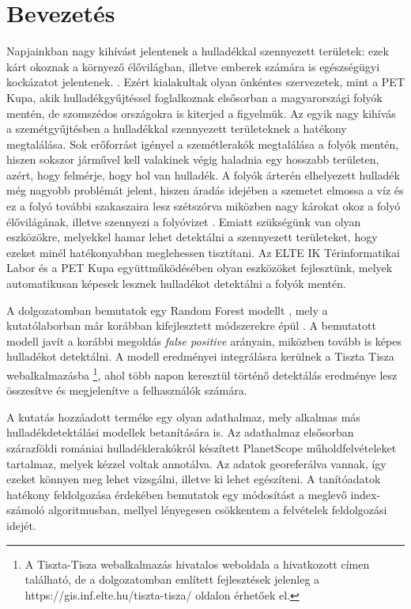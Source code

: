 \chapter{Bevezetés}
\label{ch:intro}

Napjainkban nagy kihívást jelentenek a hulladékkal szennyezett területek: ezek kárt okoznak a környező élővilágban, illetve emberek számára is egészségügyi kockázatot jelentenek. \cite{kibria2023PlasticWaste}. Ezért kialakultak olyan önkéntes szervezetek, mint a PET Kupa, akik hulladékgyűjtéssel foglalkoznak elsősorban a magyarországi folyók mentén, de szomszédos országokra is kiterjed a figyelmük. Az egyik nagy kihívás a szemétgyűjtésben a hulladékkal szennyezett területeknek a hatékony megtalálása. Sok erőforrást igényel a szemétlerakók megtalálása a folyók mentén, hiszen sokszor járművel kell valakinek végig haladnia egy hosszabb területen, azért, hogy felmérje, hogy hol van hulladék. A folyók árterén elhelyezett hulladék még nagyobb problémát jelent, hiszen áradás idejében a szemetet elmossa a víz és ez a folyó további szakaszaira lesz szétszórva miközben nagy károkat okoz a folyó élővilágának, illetve szennyezi a folyóvizet \cite{nyberg2023, vanEmmerik2023}. Emiatt szükségünk van olyan eszközökre, melyekkel hamar lehet detektálni a szennyezett területeket, hogy ezeket minél hatékonyabban meglehessen tisztítani. Az ELTE IK Térinformatikai Labor és a PET Kupa együttműködésében olyan eszközöket fejlesztünk, melyek automatikusan képesek lesznek hulladékot detektálni a folyók mentén.

A dolgozatomban bemutatok egy Random Forest modellt \cite{breiman2001}, mely a kutatólaborban már korábban kifejlesztett módszerekre épül \cite{magyar2023}. A bemutatott modell javít a korábbi megoldás \textit{false positive} arányain, miközben tovább is képes hulladékot detektálni. A modell eredményei integrálásra kerülnek a Tiszta Tisza webalkalmazásba \cite{tisztatisza2024}\footnote{A Tiszta-Tisza webalkalmazás hivatalos weboldala a hivatkozott címen található, de a dolgozatomban említett fejlesztések jelenleg a https://gis.inf.elte.hu/tiszta-tisza/ oldalon érhetőek el.}, ahol több napon keresztül történő detektálás eredménye lesz összesítve és megjelenítve a felhasználók számára.

A kutatás hozzáadott terméke egy olyan adathalmaz, mely alkalmas más hulladékdetektálási modellek betanítására is. Az adathalmaz elsősorban szárazföldi romániai hulladéklerakókról készített PlanetScope műholdfelvételeket tartalmaz, melyek kézzel voltak annotálva. Az adatok georeferálva vannak, így ezeket könnyen meg lehet vizsgálni, illetve ki lehet egészíteni. A tanítóadatok hatékony feldolgozása érdekében bemutatok egy módosítást a meglevő index-számoló algoritmusban, mellyel lényegesen csökkentem a felvételek feldolgozási idejét.

